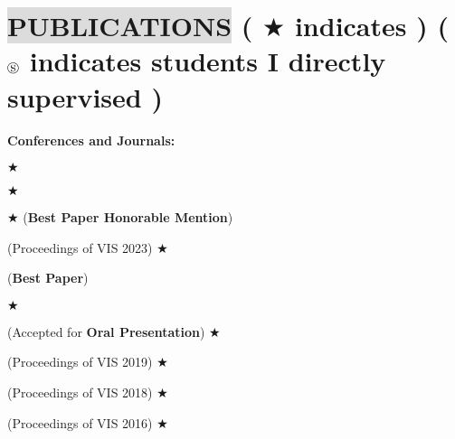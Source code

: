 \section*{
    \colorbox{gainsboro}{PUBLICATIONS}  {\small \normalfont ( \footnotesize $\bigstar$ \small indicates  ) ( $\circledS$ indicates students I directly supervised )}
}
    

\textbf{Conferences and Journals:}
\vspace{-3mm}
\begin{etaremune}[leftmargin=7mm]
    \item {} \footnotesize $\bigstar$ \small
    \item {} \footnotesize $\bigstar$ \small
    \item {} \footnotesize $\bigstar$ \small (\textbf{Best Paper Honorable Mention})
    \item {} (Proceedings of VIS 2023) \footnotesize $\bigstar$ \small
    \item {}
    \item {}
    \item {} (\textbf{Best Paper})
    \item {}
    \item {} \footnotesize $\bigstar$ \small
    \item {} (Accepted for \textbf{Oral Presentation}) \footnotesize $\bigstar$ \small
    \item {} (Proceedings of VIS 2019) \footnotesize $\bigstar$ \small
    \item {} (Proceedings of VIS 2018) \footnotesize $\bigstar$ \small
    \item {} (Proceedings of VIS 2016) \footnotesize $\bigstar$ \small
    \item {}
\end{etaremune}

